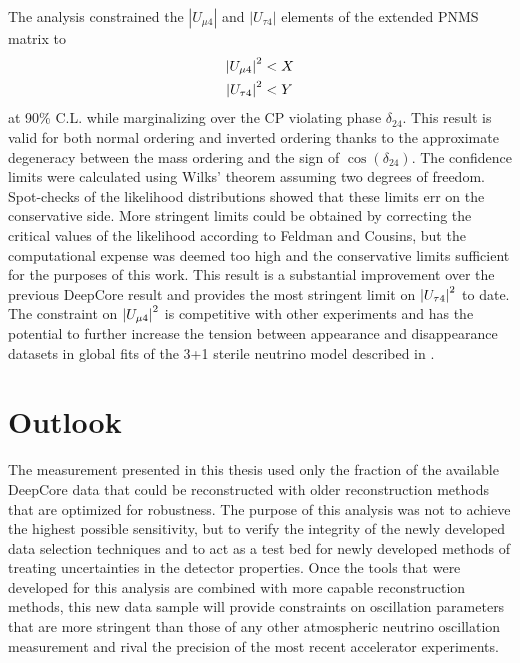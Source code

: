 The analysis constrained the $|U_{\mu4}|$ and $|U_{\tau4}|$ elements of the extended PNMS matrix to
\begin{equation}
    \begin{aligned}
        \abs{U_{\mu4}}^2 &< X \\
        \abs{U_{\tau4}}^2 &< Y \\
    \end{aligned}
\end{equation}
at 90\% C.L. while marginalizing over the CP violating phase $\delta_{24}$. This result is valid for both normal ordering and inverted ordering thanks to the approximate degeneracy between the mass ordering and the sign of $\cos(\delta_{24})$. The confidence limits were calculated using Wilks' theorem assuming two degrees of freedom. Spot-checks of the likelihood distributions showed that these limits err on the conservative side. More stringent limits could be obtained by correcting the critical values of the likelihood according to Feldman and Cousins\cite{Feldman_1998}, but the computational expense was deemed too high and the conservative limits sufficient for the purposes of this work. This result is a substantial improvement over the previous DeepCore result and provides the most stringent limit on $\abs{U_{\tau4}}^2$ to date. The constraint on $\abs{U_{\mu4}}^2$ is competitive with other experiments and has the potential to further increase the tension between appearance and disappearance datasets in global fits of the 3+1 sterile neutrino model described in .

\section{Outlook}

The measurement presented in this thesis used only the fraction of the available DeepCore data that could be reconstructed with older reconstruction methods that are optimized for robustness. The purpose of this analysis was not to achieve the highest possible sensitivity, but to verify the integrity of the newly developed data selection techniques and to act as a test bed for newly developed methods of treating uncertainties in the detector properties. Once the tools that were developed for this analysis are combined with more capable reconstruction methods, this new data sample will provide constraints on oscillation parameters that are more stringent than those of any other atmospheric neutrino oscillation measurement and rival the precision of the most recent accelerator experiments.

